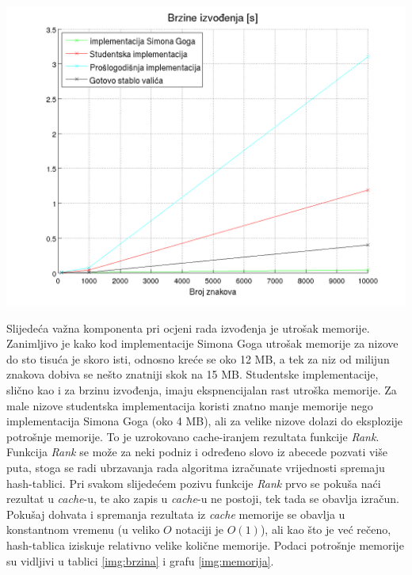 \documentclass[times, utf8, seminar, numeric]{fer}
\begin{document}
\begin{center}
	\includegraphics[scale=0.75]{slike/odlican_speed.png}
	\label{img:brzina}
\end{center}

Slijedeća važna komponenta pri ocjeni rada izvođenja je utrošak memorije. Zanimljivo je kako kod implementacije Simona Goga utrošak memorije za nizove do sto tisuća je skoro isti, odnosno kreće se oko 12 MB, a tek za niz od milijun znakova dobiva se nešto znatniji skok na 15 MB. Studentske implementacije, slično kao i za brzinu izvođenja, imaju ekspnencijalan rast utroška memorije. Za male nizove studentska implementacija koristi znatno manje memorije nego implementacija Simona Goga (oko 4 MB), ali za velike nizove dolazi do eksplozije potrošnje memorije. To je uzrokovano cache-iranjem rezultata funkcije \textit{Rank}. Funkcija \textit{Rank} se  može za neki podniz i određeno slovo iz abecede pozvati više puta, stoga se radi ubrzavanja rada algoritma izračunate vrijednosti spremaju hash-tablici. Pri svakom slijedećem pozivu funkcije \textit{Rank} prvo se pokuša naći rezultat u \textit{cache}-u, te ako zapis u \textit{cache}-u ne postoji, tek tada se obavlja izračun. Pokušaj dohvata i spremanja rezultata iz \textit{cache} memorije se obavlja u konstantnom vremenu (u veliko $O$ notaciji je $O(1)$), ali kao što je već rečeno, hash-tablica iziskuje relativno velike količne memorije. Podaci potrošnje memorije su vidljivi u tablici \ref{img:brzina} i grafu \ref{img:memorija}. 
\end{document}
